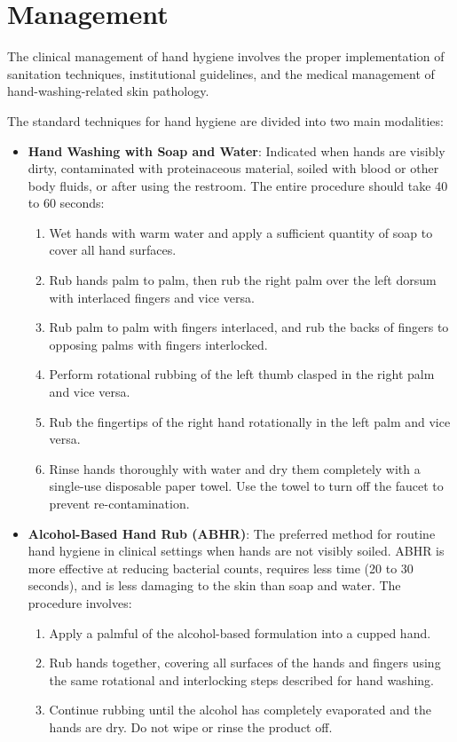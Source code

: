 \section*{Management}
The clinical management of hand hygiene involves the proper implementation of sanitation techniques, institutional guidelines, and the medical management of hand-washing-related skin pathology.

The standard techniques for hand hygiene are divided into two main modalities:
\begin{itemize}
    \item \textbf{Hand Washing with Soap and Water}: Indicated when hands are visibly dirty, contaminated with proteinaceous material, soiled with blood or other body fluids, or after using the restroom. The entire procedure should take 40 to 60 seconds:
    \begin{enumerate}
        \item Wet hands with warm water and apply a sufficient quantity of soap to cover all hand surfaces.
        \item Rub hands palm to palm, then rub the right palm over the left dorsum with interlaced fingers and vice versa.
        \item Rub palm to palm with fingers interlaced, and rub the backs of fingers to opposing palms with fingers interlocked.
        \item Perform rotational rubbing of the left thumb clasped in the right palm and vice versa.
        \item Rub the fingertips of the right hand rotationally in the left palm and vice versa.
        \item Rinse hands thoroughly with water and dry them completely with a single-use disposable paper towel. Use the towel to turn off the faucet to prevent re-contamination.
    \end{enumerate}
    \item \textbf{Alcohol-Based Hand Rub (ABHR)}: The preferred method for routine hand hygiene in clinical settings when hands are not visibly soiled. ABHR is more effective at reducing bacterial counts, requires less time (20 to 30 seconds), and is less damaging to the skin than soap and water. The procedure involves:
    \begin{enumerate}
        \item Apply a palmful of the alcohol-based formulation into a cupped hand.
        \item Rub hands together, covering all surfaces of the hands and fingers using the same rotational and interlocking steps described for hand washing.
        \item Continue rubbing until the alcohol has completely evaporated and the hands are dry. Do not wipe or rinse the product off.
    \end{enumerate}
\end{itemize}

